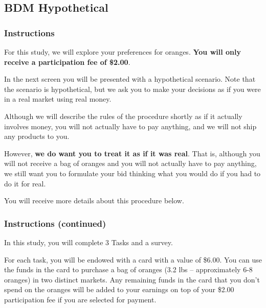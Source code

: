 \documentclass[12pt]{article}
\begin{document}
{\clearpage


\subsection{BDM Hypothetical}

\subsubsection*{Instructions }


For this study, we will explore your preferences for oranges. \textbf{You will only receive a participation fee of \$2.00}. \par

 In the next screen you will be presented with a hypothetical scenario. Note that the scenario is hypothetical, but we ask you to make your decisions as if you were in a real market using real money. \par

Although we will describe the rules of the procedure shortly as if it actually involves money, you will not actually have to pay anything, and we will not ship any products to you. \par

However,\textbf{ we do want you to treat it as if it was real}. That is, although you will not receive a bag of oranges and you will not actually have to pay anything, we still want you to formulate your bid thinking what you would do if you had to do it for real. \par

You will receive more details about this procedure below.

\clearpage



\subsubsection*{Instructions (continued)}

In this study, you will complete 3 Tasks and a survey.

For each task, you will be endowed with a card with a value of \$6.00. You can use the funds in the card to purchase a bag of oranges (3.2 lbs – approximately 6-8 oranges) in two distinct markets. Any remaining funds in the card that you don’t spend on the oranges will be added to your earnings on top of your \$2.00 participation fee if you are selected for payment.



}
\end{document}
